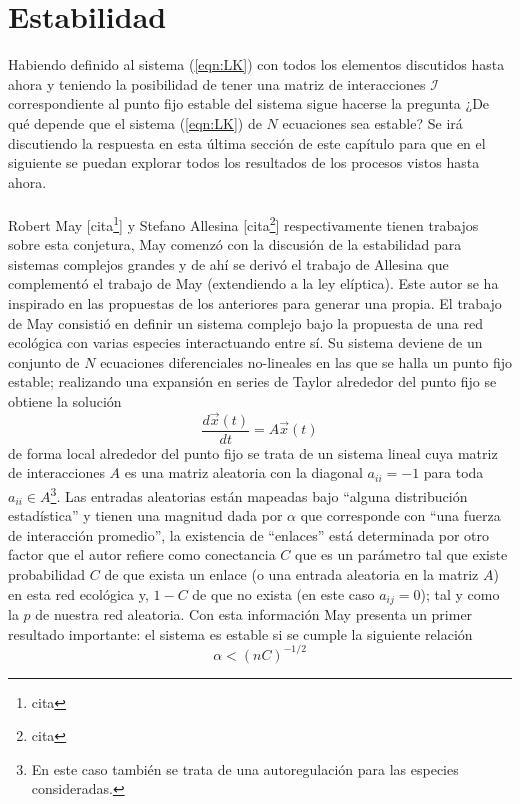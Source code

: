 \newpage
\section{Estabilidad}

Habiendo definido al sistema (\ref{eqn:LK}) con todos los elementos discutidos hasta ahora y teniendo la posibilidad de tener una matriz de interacciones $\mathcal{I}$ correspondiente al punto fijo estable del sistema sigue hacerse la pregunta ¿De qué depende que el sistema (\ref{eqn:LK}) de $N$ ecuaciones sea estable? Se irá discutiendo la respuesta en esta última sección de este capítulo para que en el siguiente se puedan explorar todos los resultados de los procesos vistos hasta ahora.\\
\\
Robert May [cita\footnote{cita}] y Stefano Allesina [cita\footnote{cita}] respectivamente tienen trabajos sobre esta conjetura, May comenzó con la discusión de la estabilidad para sistemas complejos grandes y de ahí se derivó el trabajo de Allesina que complementó el trabajo de May (extendiendo a la ley elíptica). Este autor se ha inspirado en las propuestas de los anteriores para generar una propia. El trabajo de May consistió en definir un sistema complejo bajo la propuesta de una red ecológica con varias especies interactuando entre sí. Su sistema deviene de un conjunto de $N$ ecuaciones diferenciales no-lineales en las que se halla un punto fijo estable; realizando una expansión en series de Taylor alrededor del punto fijo se obtiene la solución
$$\frac{d\vec{x}(t)}{dt}=A\vec{x}(t)$$
de forma local alrededor del punto fijo se trata de un sistema lineal cuya matriz de interacciones $A$ es una matriz aleatoria con la diagonal $a_{ii}=-1$ para toda $a_{ii}\in A$\footnote{En este caso también se trata de una autoregulación para las especies consideradas.}. Las entradas aleatorias están mapeadas bajo ``alguna distribución estadística'' y tienen una magnitud dada por $\alpha$ que corresponde con ``una fuerza de interacción promedio'', la existencia de ``enlaces'' está determinada por otro factor que el autor refiere como conectancia $C$ que es un parámetro tal que existe probabilidad $C$ de que exista un enlace (o una entrada aleatoria en la matriz $A$) en esta red ecológica y, $1-C$ de que no exista (en este caso $a_{ij}=0$); tal y como la $p$ de nuestra red aleatoria. Con esta información May presenta un primer resultado importante: el sistema es estable si se cumple la siguiente relación
\begin{equation}\label{eqn:parametroMay}
	\alpha < (nC)^{-1/2}
\end{equation}

